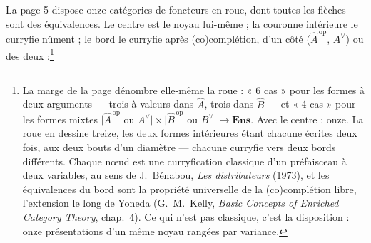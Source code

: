 \documentclass[11pt,a4paper]{article}
\begin{document}
La page 5 dispose onze catégories de foncteurs en roue, dont toutes les
flèches sont des équivalences. Le centre est le noyau lui-même ; la couronne
intérieure le curryfie nûment ; le bord le curryfie après (co)complétion,
d'un côté ($\widehat{A}^{\,\mathrm{op}}$, $A^{\vee}$) ou des
deux :\footnote{La marge de la page dénombre elle-même la roue : « 6 cas »
pour les formes à deux arguments — trois à valeurs dans $\widehat{A}$, trois
dans $\widehat{B}$ — et « 4 cas » pour les formes mixtes
$\bigl|\widehat{A}^{\,\mathrm{op}} \text{ ou } A^{\vee}\bigr| \times
\bigl|\widehat{B}^{\,\mathrm{op}} \text{ ou } B^{\vee}\bigr| \to
\mathbf{Ens}$. Avec le centre : onze. La roue en dessine treize, les deux
formes intérieures étant chacune écrites deux fois, aux deux bouts d'un
diamètre — chacune curryfie vers deux bords différents. Chaque nœud est une
curryfication classique d'un préfaisceau à deux variables, au sens de
J.~Bénabou, \emph{Les distributeurs} (1973), et les équivalences du bord sont
la propriété universelle de la (co)complétion libre, l'extension le long de
Yoneda (G.~M.~Kelly, \emph{Basic Concepts of Enriched Category Theory},
chap.~4). Ce qui n'est pas classique, c'est la disposition : onze
présentations d'un même noyau rangées par variance.}

\end{document}
